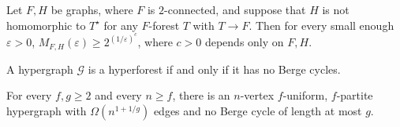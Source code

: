 \documentclass[10pt,a4paper]{amsart}
\renewcommand{\geq}{\geqslant}
\begin{document}
\begin{theorem}\label{thm:approx hom hardness}
	Let $F,H$ be graphs, where $F$ is $2$-connected, and suppose that $H$ is not homomorphic to $T^{\star}$ for any $F$-forest $T$ with $T\rightarrow F$. 
	Then for every small enough $\varepsilon > 0$,
	$M_{F,H}(\varepsilon) \geq 2^{(1/\varepsilon)^c}$, where $c > 0$ depends only on $F,H$. 
\end{theorem}

	\begin{lemma}\label{lem:hyperforest}
		A hypergraph $\mathcal{G}$ is a hyperforest if and only if it has no Berge cycles. 
	\end{lemma}

	\begin{lemma}\label{lem:high-girth hypergraph}
		For every $f,g \geq 2$ and every $n\geq f$, there is an $n$-vertex $f$-uniform, $f$-partite hypergraph with $\Omega(n^{1+1/g})$ edges and no Berge cycle of length at most $g$.
	\end{lemma}
\end{document}
